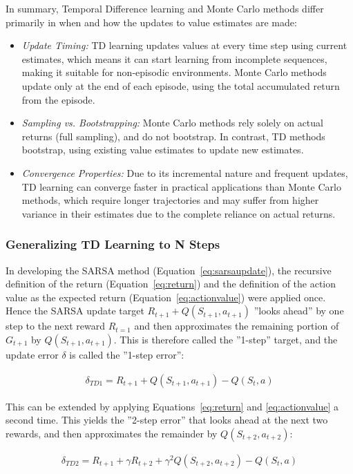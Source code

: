 In summary, Temporal Difference learning and Monte Carlo methods differ primarily in when and how the updates to value estimates are made:
\begin{itemize}
\item \emph{Update Timing:} TD learning updates values at every time step using current estimates, which means it can start learning from incomplete sequences, making it suitable for non-episodic environments. Monte Carlo methods update only at the end of each episode, using the total accumulated return from the episode.
\item \emph{Sampling vs. Bootstrapping:} Monte Carlo methods rely solely on actual returns (full sampling), and do not bootstrap. In contrast, TD methods bootstrap, using existing value estimates to update new estimates.
\item \emph{Convergence Properties:} Due to its incremental nature and frequent updates, TD learning can converge faster in practical applications than Monte Carlo methods, which require longer trajectories and may suffer from higher variance in their estimates due to the complete reliance on actual returns.
\end{itemize}

\subsubsection*{Generalizing TD Learning to N Steps}

In developing the SARSA method (Equation~\ref{eq:sarsaupdate}), the recursive definition of the return (Equation~\ref{eq:return}) and the definition of the action value as the expected return (Equation~\ref{eq:actionvalue}) were applied once. Hence the SARSA update target $R_{t+1} + Q(S_{t+1}, a_{t+1})$ ''looks ahead'' by one step to the next reward $R_{t=1}$ and then approximates the remaining portion of $G_{t+1}$ by $Q(S_{t+1}, a_{t+1})$. This is therefore called the ''1-step'' target, and the update error $\delta$ is called the ''1-step error'':

\begin{align*}
\delta_{TD1} = R_{t+1} + Q(S_{t+1}, a_{t+1}) - Q(S_t, a)
\end{align*}

This can be extended by applying Equations~\ref{eq:return} and \ref{eq:actionvalue} a second time. This yields the ''2-step error'' that looks ahead at the next two rewards, and then approximates the remainder by $Q(S_{t+2}, a_{t+2})$:

\begin{align*}
\delta_{TD2} = R_{t+1} + \gamma R_{t+2} + \gamma^2 Q(S_{t+2}, a_{t+2}) - Q(S_t, a)
\end{align*}

